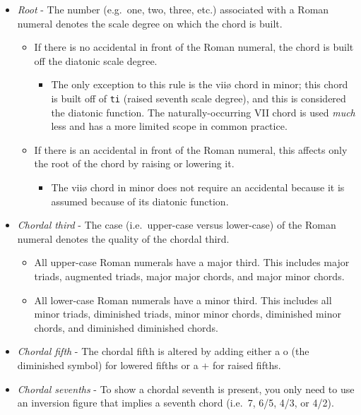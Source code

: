 \documentclass{book}
\providecommand{\tightlist}{%
  \setlength{\itemsep}{0pt}\setlength{\parskip}{0pt}}
\begin{document}
\begin{itemize}
\item
  \emph{Root} - The number (e.g.~one, two, three, etc.) associated with a
  Roman numeral denotes the scale degree on which the chord is built.

  \begin{itemize}
  \tightlist
  \item
    If there is no accidental in front of the Roman numeral, the chord is
    built off the diatonic scale degree.

    \begin{itemize}
    \tightlist
    \item
      The only exception to this rule is the viiø chord in minor; this chord
      is built off of \texttt{ti} (raised seventh scale degree), and this is
      considered the diatonic function. The naturally-occurring VII chord is
      used \emph{much} less and has a more limited scope in common practice.
    \end{itemize}
  \item
    If there is an accidental in front of the Roman numeral, this affects only
    the root of the chord by raising or lowering it.

    \begin{itemize}
    \tightlist
    \item
      The viiø chord in minor does not require an accidental because it is
      assumed because of its diatonic function.
    \end{itemize}
  \end{itemize}
\item
  \emph{Chordal third} - The case (i.e.~upper-case versus lower-case) of the
  Roman numeral denotes the quality of the chordal third.

  \begin{itemize}
  \tightlist
  \item
    All upper-case Roman numerals have a major third. This includes major
    triads, augmented triads, major major chords, and major minor chords.
  \item
    All lower-case Roman numerals have a minor third. This includes all minor
    triads, diminished triads, minor minor chords, diminished minor chords,
    and diminished diminished chords.
  \end{itemize}
\item
  \emph{Chordal fifth} - The chordal fifth is altered by adding either a o
  (the diminished symbol) for lowered fifths or a + for raised fifths.
\item
  \emph{Chordal sevenths} - To show a chordal seventh is present, you only
  need to use an inversion figure that implies a seventh chord (i.e.~7, 6/5,
  4/3, or 4/2).


\end{itemize}
\end{document}
